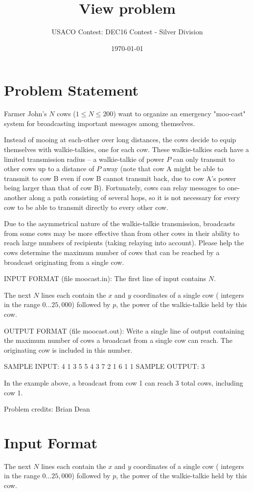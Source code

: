 \documentclass[12pt]{article}
\title{View problem}
\author{USACO Contest: DEC16 Contest - Silver Division}
\date{\today}
\begin{document}
\maketitle

\section*{Problem Statement}

Farmer John's $N$ cows ($1 \leq N \leq 200$) want to organize an emergency
"moo-cast" system for broadcasting important messages among themselves.  

Instead of mooing at each-other over long distances, the cows decide to equip
themselves with walkie-talkies, one for each cow.  These walkie-talkies each
have a limited transmission radius -- a walkie-talkie of power $P$ can only
transmit to other cows up to a distance of $P$ away (note that cow A might
be able to transmit to cow B even if cow B cannot transmit back, due to cow
A's power being larger than that of cow B).  Fortunately, cows can relay messages
to one-another along a path consisting of several hops, so it is not necessary
for every cow to be able to transmit directly to every other cow.

Due to the asymmetrical nature of the walkie-talkie transmission, broadcasts
from some cows may be more effective than from other cows in their ability to
reach large numbers of recipients (taking relaying into account).  Please  help
the cows determine the maximum number of cows that can be reached by a broadcast
originating from a single cow.

INPUT FORMAT (file moocast.in):
The first line of input contains $N$.

The next $N$ lines each contain the $x$ and $y$ coordinates of a single cow ( 
integers in the range $0 \ldots 25,000$) followed by $p$, the power of the
walkie-talkie held by this cow.

OUTPUT FORMAT (file moocast.out):
Write a single line of output containing the maximum number of cows a broadcast
from a single cow can reach.  The originating cow is included in this number.

SAMPLE INPUT:
4
1 3 5
5 4 3
7 2 1
6 1 1
SAMPLE OUTPUT: 
3

In the example above, a broadcast from cow 1 can reach 3 total cows, including
cow 1.

Problem credits: Brian Dean



\section*{Input Format}
The next $N$ lines each contain the $x$ and $y$ coordinates of a single cow ( 
integers in the range $0 \ldots 25,000$) followed by $p$, the power of the
walkie-talkie held by this cow.
\end{document}

